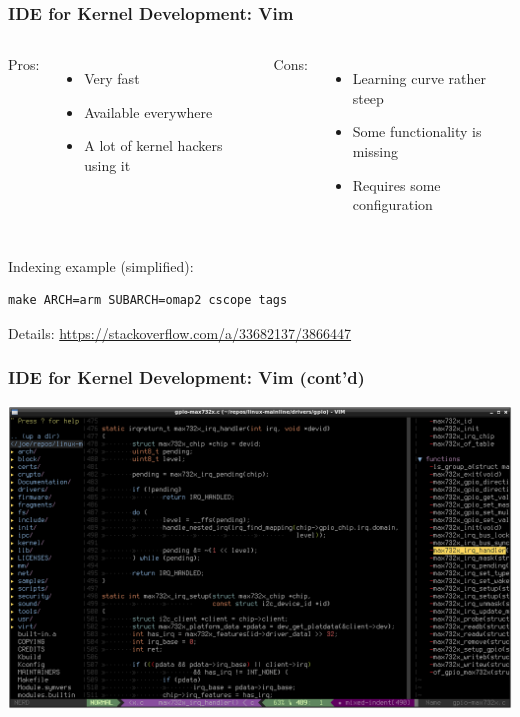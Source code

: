\documentclass[aspectratio=169]{beamer}
\begin{document}
\begin{frame}[fragile]
  \frametitle{IDE for Kernel Development: Vim}
  \begin{columns}
    Pros:
    \begin{itemize}
      \item Very fast
      \item Available everywhere
      \item A lot of kernel hackers using it
    \end{itemize}
    Cons:
    \begin{itemize}
      \item Learning curve rather steep
      \item Some functionality is missing
      \item Requires some configuration
    \end{itemize}
  \end{columns}
  \bigskip
  Indexing example (simplified):
  \begin{verbatim}
make ARCH=arm SUBARCH=omap2 cscope tags
  \end{verbatim}
  Details: \href{https://stackoverflow.com/a/33682137/3866447}
                {https://stackoverflow.com/a/33682137/3866447}
\end{frame}

\begin{frame}
  \frametitle{IDE for Kernel Development: Vim (cont'd)}
  \begin{center}
    \includegraphics[scale=0.4]{images/vim.png}
  \end{center}
  \vspace*{-10mm} %
\end{frame}
\end{document}
